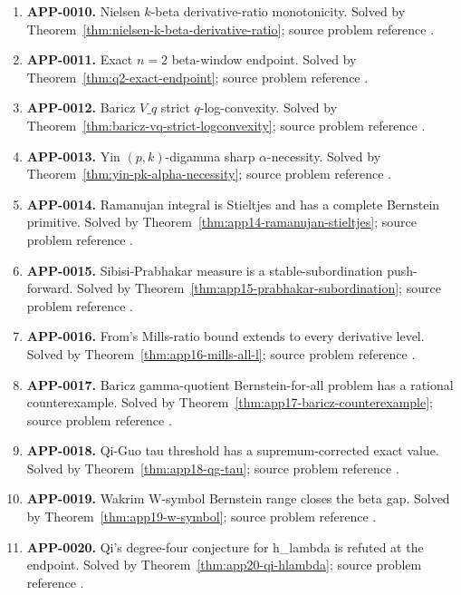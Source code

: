 \documentclass[11pt]{article}
\numberwithin{equation}{section}
\theoremstyle{definition}
\theoremstyle{remark}
\newcommand{\1}{\mathbf 1}
\begin{document}
\begin{enumerate}
\item \label{ledger:app-0010}\textbf{APP-0010.} Nielsen \(k\)-beta derivative-ratio monotonicity. Solved by Theorem~\ref{thm:nielsen-k-beta-derivative-ratio}; source problem reference \cite{yin-zhang-k-beta}.
\item \label{ledger:app-0011}\textbf{APP-0011.} Exact \(n=2\) beta-window endpoint. Solved by Theorem~\ref{thm:q2-exact-endpoint}; source problem reference \cite{app-app-0004-source}.
\item \label{ledger:app-0012}\textbf{APP-0012.} Baricz \(V\_q\) strict \(q\)-log-convexity. Solved by Theorem~\ref{thm:baricz-vq-strict-logconvexity}; source problem reference \cite{baricz-turan-thesis}.
\item \label{ledger:app-0013}\textbf{APP-0013.} Yin \((p,k)\)-digamma sharp \(\alpha\)-necessity. Solved by Theorem~\ref{thm:yin-pk-alpha-necessity}; source problem reference \cite{yin-pk-digamma}.
\item \label{ledger:app-0014}\textbf{APP-0014.} Ramanujan integral is Stieltjes and has a complete Bernstein primitive. Solved by Theorem~\ref{thm:app14-ramanujan-stieltjes}; source problem reference \cite{mishra-swaminathan-ramanujan}.
\item \label{ledger:app-0015}\textbf{APP-0015.} Sibisi-Prabhakar measure is a stable-subordination push-forward. Solved by Theorem~\ref{thm:app15-prabhakar-subordination}; source problem reference \cite{sibisi-prabhakar}.
\item \label{ledger:app-0016}\textbf{APP-0016.} From's Mills-ratio bound extends to every derivative level. Solved by Theorem~\ref{thm:app16-mills-all-l}; source problem reference \cite{from-mills}.
\item \label{ledger:app-0017}\textbf{APP-0017.} Baricz gamma-quotient Bernstein-for-all problem has a rational counterexample. Solved by Theorem~\ref{thm:app17-baricz-counterexample}; source problem reference \cite{baricz-turan}.
\item \label{ledger:app-0018}\textbf{APP-0018.} Qi-Guo tau threshold has a supremum-corrected exact value. Solved by Theorem~\ref{thm:app18-qg-tau}; source problem reference \cite{qi-guo-2004}.
\item \label{ledger:app-0019}\textbf{APP-0019.} Wakrim W-symbol Bernstein range closes the beta gap. Solved by Theorem~\ref{thm:app19-w-symbol}; source problem reference \cite{wakrim-w}.
\item \label{ledger:app-0020}\textbf{APP-0020.} Qi's degree-four conjecture for h\_lambda is refuted at the endpoint. Solved by Theorem~\ref{thm:app20-qi-hlambda}; source problem reference \cite{qi-hlambda}.

\end{enumerate}
\end{document}
